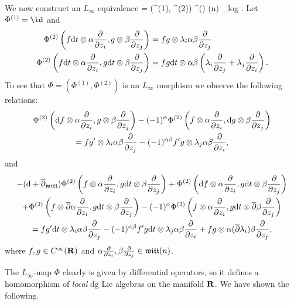 \documentclass[11pt]{amsart}
\begin{document}
We now construct an $L_\infty$ equivalence 
\beqn
\Phi = (\Phi^{(1)}, \Phi^{(2)}) \colon \Omega^\bu(\R) \otimes {}(n) \rightsquigarrow \cL_{log} .
\eeqn
Let $\Phi^{(1)} = \id$ and 
\begin{align*}
\Phi^{(2)}\left(f {\rm d} t\otimes \alpha \frac{\partial}{\partial z_i} , g \otimes \beta \frac{\partial}{\partial z_j} \right) & = fg \otimes \lambda_i \alpha \beta \frac{\partial}{\partial z_j} \\
\Phi^{(2)}\left(f {\rm d} t \otimes \alpha \frac{\partial}{\partial z_i} , g {\rm d} t \otimes \beta \frac{\partial}{\partial z_j} \right) & = fg {\rm d} t \otimes \alpha \beta \left(\lambda_i \frac{\partial}{\partial z_j} + \lambda_j \frac{\partial}{\partial z_i} \right) .
\end{align*}
To see that $\Phi = (\Phi^{(1)}, \Phi^{(2)})$ is an $L_\infty$ morphism we observe the following relations:
\begin{multline}
\Phi^{(2)}\left({\rm d} f \otimes \alpha \frac{\partial}{\partial z_i} , g \otimes \beta \frac{\partial}{\partial z_j}\right) - (-1)^{\alpha} \Phi^{(2)}\left(f \otimes \alpha \frac{\partial}{\partial z_i} , {\rm d} g \otimes \beta \frac{\partial}{\partial z_j}\right) \\ = f g' \otimes \lambda_i \alpha \beta \frac{\partial}{\partial z_j} - (-1)^{\alpha \beta} f' g \otimes \lambda_j \alpha \beta  \frac{\partial}{\partial z_i} ,
\end{multline}
and
\begin{multline}
- ({\rm d} + \overline{\partial}_{\mathfrak{witt}}) \Phi^{(2)}\left(f \otimes \alpha \frac{\partial}{\partial z_i} , g {\rm d} t \otimes \beta \frac{\partial}{\partial z_j}\right) + \Phi^{(2)}\left({\rm d} f \otimes \alpha \frac{\partial}{\partial z_i} , g {\rm d} t \otimes \beta \frac{\partial}{\partial z_j}\right) \\ + \Phi^{(2)}\left(f \otimes \overline{\partial} \alpha \frac{\partial}{\partial z_i} , g {\rm d} t \otimes \beta \frac{\partial}{\partial z_j}\right) - (-1)^\alpha \Phi^{(2)}\left(f \otimes \alpha \frac{\partial}{\partial z_i} , g {\rm d} t \otimes \overline{\partial} \beta \frac{\partial}{\partial z_j}\right)  \\ = f g' {\rm d} t \otimes \lambda_i \alpha \beta \frac{\partial}{\partial z_j} - (-1)^{\alpha \beta} f' g {\rm d} t \otimes \lambda_j \alpha \beta  \frac{\partial}{\partial z_i} + fg \otimes \alpha (\overline{\partial} \lambda_i) \beta \frac{\partial}{\partial z_j} ,
\end{multline}
where $f,g \in C^\infty(\mathbf{R})$ and $\alpha \frac{\partial}{\partial z_i}, \beta \frac{\partial}{\partial z_j} \in \mathfrak{witt}(n)$.

The $L_\infty$-map $\Phi$ clearly is given by differential operators, so it defines a homomorphism of \textit{local} dg Lie algebras on the manifold $\mathbf{R}$.
We have shown the following.
\end{document}
